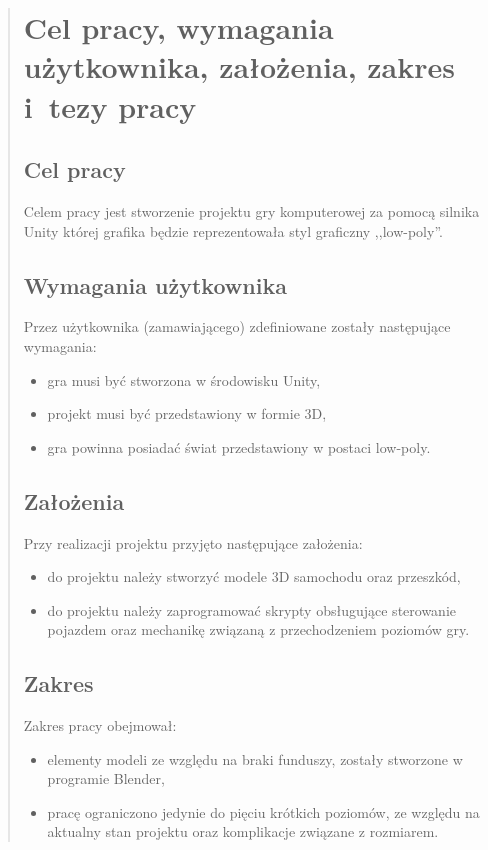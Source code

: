 \begin{quotation}
\chapter{Cel pracy, wymagania użytkownika, założenia, zakres i~tezy pracy}

\section{Cel pracy}\label{cel}

Celem pracy jest stworzenie projektu gry komputerowej za pomocą silnika Unity której grafika będzie reprezentowała styl graficzny ,,low-poly''.

\section{Wymagania użytkownika}

Przez użytkownika (zamawiającego) zdefiniowane zostały następujące wymagania:
\begin{itemize}
\item gra musi być stworzona w środowisku Unity,
\item projekt musi być przedstawiony w formie 3D,
\item gra powinna posiadać świat przedstawiony w postaci low-poly.
\end{itemize}

\section{Założenia}

Przy realizacji projektu przyjęto następujące założenia:
\begin{itemize}
\item do projektu należy stworzyć modele 3D samochodu oraz przeszkód,
\item do projektu należy zaprogramować skrypty obsługujące sterowanie pojazdem oraz mechanikę związaną z przechodzeniem poziomów gry.
\end{itemize}

\section{Zakres}

Zakres pracy obejmował:
\begin{itemize}
\item elementy modeli ze względu na braki funduszy, zostały stworzone w programie Blender,
\item pracę ograniczono jedynie do pięciu krótkich poziomów, ze względu na aktualny stan projektu oraz komplikacje związane z rozmiarem.
\end{itemize}


\end{quotation}
